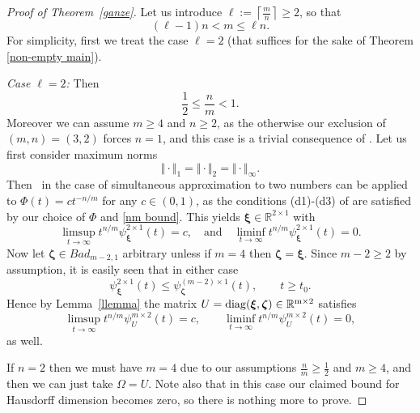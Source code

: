 \documentclass[10pt]{amsart}
\theoremstyle{definition}
\newcommand{\ux}{\boldsymbol{\xi}}
\newcommand{\uz}{\boldsymbol{\zeta}}
\newcommand{\R}{\mathbb{R}}
\begin{document}
\begin{proof}[Proof of Theorem~\ref{ganze}]

Let us introduce $\ell:= \left\lceil \frac{m}{n}\right\rceil \ge 2$, so that 
\begin{equation} \label{eq:ojsi}
    (\ell-1)n< m \le \ell n.
\end{equation}
    For simplicity, first we treat the case $\ell=2$ (that suffices
    for the sake of Theorem \ref{non-empty main}). 

    {\em Case $\ell=2$:}
    Then
    \begin{equation} \label{nm bound}
    \frac{1}{2}\le \frac{n}{m} < 1.
    \end{equation}
    Moreover we can assume $m\ge 4$ and $n\ge 2$, as the otherwise 
    our exclusion of $(m,n)=(3,2)$ forces
    $n=1$, and this
    case is a trivial consequence of \cite{j1}.
    Let us first consider maximum norms
    \begin{equation} \label{eq:maxno}
\Vert\cdot\Vert_1=\Vert\cdot\Vert_2=\Vert\cdot\Vert_{\infty}.
\end{equation}
    Then~\cite[Theorem~2.2]{j1} in the case of simultaneous approximation to two numbers 
    can be applied to $\Phi(t)=ct^{-n/m}$ for
    any $c\in (0,1)$, as the conditions (d1)-(d3) of \cite{j1} are satisfied by our choice of $\Phi$ and \eqref{nm bound}. This yields $\ux\in \R^{2\times 1}$ with
    \[
    \limsup_{t\to\infty} t^{n/m} \psi^{2\times 1}_{\ux}(t) = c, \quad \text{and} \quad \liminf_{t\to\infty} t^{n/m} \psi^{2\times 1}_{\ux}(t) = 0.
    \]
    Now let $\uz\in Bad_{m-2,1}$ arbitrary 
    unless if $m=4$ then $\uz=\ux$. 
    Since $m-2\ge 2$ by assumption, it is easily seen that in either case
     \[
    \psi_{\ux}^{2\times 1}(t) \le \psi_{\uz}^{(m-2)\times 1}(t), \qquad t\ge t_0.
    \]
    Hence by Lemma~\ref{llemma} the matrix
    $U=\rm{diag}(\ux,\uz)\in \R^{ m \times 2}$ 
    satisfies
    \begin{equation} \label{Vt property}
    \limsup_{t\to\infty} t^{n/m} \psi^{m\times 2}_{U}(t) = c, \qquad \liminf_{t\to\infty} t^{n/m} \psi^{m\times 2}_{U}(t) = 0,
    \end{equation}
    as well. \par 
    If $n=2$ then we must have $m=4$ due to our assumptions $\tfrac{n}{m}\geq \frac{1}{2}$ and $m\ge 4$, and 
    then we can just take $\Omega=U$.
    Note also that in this case
    our claimed bound for Hausdorff dimension becomes zero, so there is nothing more to prove.\par 

\end{proof}
\end{document}
